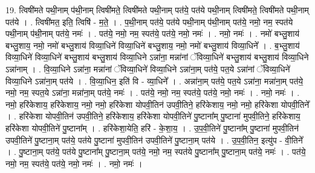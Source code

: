 \documentclass[17pt]{extarticle}
\begin{document}
19. त्विषी॑मते पथी॒नाम् प॑थी॒नाम् त्विषी॑मते॒ त्विषी॑मते पथी॒नाम् पत॑ये॒ पत॑ये पथी॒नाम् त्विषी॑मते॒ त्विषी॑मते पथी॒नाम् पत॑ये । . त्विषी॑मत॒ इति॒ त्विषि॑ - म॒ते॒ । . प॒थी॒नाम् पत॑ये॒ पत॑ये पथी॒नाम् प॑थी॒नाम् पत॑ये॒ नमो॒ नम॒ स्पत॑ये पथी॒नाम् प॑थी॒नाम् पत॑ये॒ नमः॑ । . पत॑ये॒ नमो॒ नम॒ स्पत॑ये॒ पत॑ये॒ नमो॒ नमः॑ । . नमो॒ नमः॑ । . नमो॑ बभ्लु॒शाय॑ बभ्लु॒शाय॒ नमो॒ नमो॑ बभ्लु॒शाय॑ विव्या॒धिने॑ विव्या॒धिने॑ बभ्लु॒शाय॒ नमो॒ नमो॑ बभ्लु॒शाय॑ विव्या॒धिने᳚ । . ब॒भ्लु॒शाय॑ विव्या॒धिने॑ विव्या॒धिने॑ बभ्लु॒शाय॑ बभ्लु॒शाय॑ विव्या॒धिने ऽन्ना॑ना॒ मन्ना॑नां ॅविव्या॒धिने॑ बभ्लु॒शाय॑ बभ्लु॒शाय॑ विव्या॒धिने ऽन्ना॑नाम् । . वि॒व्या॒धिने ऽन्ना॑ना॒ मन्ना॑नां ॅविव्या॒धिने॑ विव्या॒धिने ऽन्ना॑ना॒म् पत॑ये॒ पत॒ये ऽन्ना॑नां ॅविव्या॒धिने॑ विव्या॒धिने ऽन्ना॑ना॒म् पत॑ये । . वि॒व्या॒धिन॒ इति॑ वि - व्या॒धिने᳚ । . अन्ना॑ना॒म् पत॑ये॒ पत॒ये ऽन्ना॑ना॒ मन्ना॑ना॒म् पत॑ये॒ नमो॒ नम॒ स्पत॒ये ऽन्ना॑ना॒ मन्ना॑ना॒म् पत॑ये॒ नमः॑ । . पत॑ये॒ नमो॒ नम॒ स्पत॑ये॒ पत॑ये॒ नमो॒ नमः॑ । . नमो॒ नमः॑ । . नमो॒ हरि॑केशाय॒ हरि॑केशाय॒ नमो॒ नमो॒ हरि॑केशा योपवी॒तिन॑ उपवी॒तिने॒ हरि॑केशाय॒ नमो॒ नमो॒ हरि॑केशा योपवी॒तिने᳚ । . हरि॑केशा योपवी॒तिन॑ उपवी॒तिने॒ हरि॑केशाय॒ हरि॑केशा योपवी॒तिने॑ पु॒ष्टाना᳚म् पु॒ष्टाना॑ मुपवी॒तिने॒ हरि॑केशाय॒ हरि॑केशा योपवी॒तिने॑ पु॒ष्टाना᳚म् । . हरि॑केशा॒येति॒ हरि॑ - के॒शा॒य॒ । . उ॒प॒वी॒तिने॑ पु॒ष्टाना᳚म् पु॒ष्टाना॑ मुपवी॒तिन॑ उपवी॒तिने॑ पु॒ष्टाना॒म् पत॑ये॒ पत॑ये पु॒ष्टाना॑ मुपवी॒तिन॑ उपवी॒तिने॑ पु॒ष्टाना॒म् पत॑ये । . उ॒प॒वी॒तिन॒ इत्यु॑प - वी॒तिने᳚ । . पु॒ष्टाना॒म् पत॑ये॒ पत॑ये पु॒ष्टाना᳚म् पु॒ष्टाना॒म् पत॑ये॒ नमो॒ नम॒ स्पत॑ये पु॒ष्टाना᳚म् पु॒ष्टाना॒म् पत॑ये॒ नमः॑ । . पत॑ये॒ नमो॒ नम॒ स्पत॑ये॒ पत॑ये॒ नमो॒ नमः॑ । . नमो॒ नमः॑ । \newline
\end{document}
